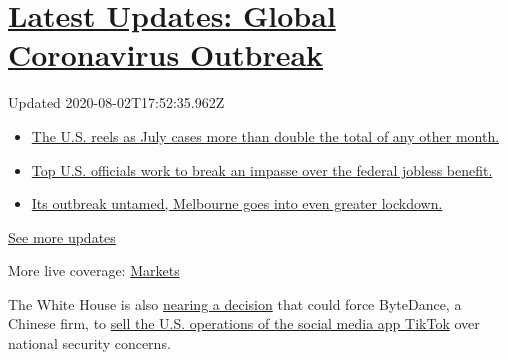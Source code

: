 \hypertarget{latest-updates-global-coronavirus-outbreak}{%
\section{\texorpdfstring{\href{https://www.nytimes.com/2020/08/01/world/coronavirus-covid-19.html?action=click\&pgtype=Article\&state=default\&region=MAIN_CONTENT_1\&context=storylines_live_updates}{Latest
Updates: Global Coronavirus
Outbreak}}{Latest Updates: Global Coronavirus Outbreak}}\label{latest-updates-global-coronavirus-outbreak}}

Updated 2020-08-02T17:52:35.962Z

\begin{itemize}
\tightlist
\item
  \href{https://www.nytimes.com/2020/08/01/world/coronavirus-covid-19.html?action=click\&pgtype=Article\&state=default\&region=MAIN_CONTENT_1\&context=storylines_live_updates\#link-34047410}{The
  U.S. reels as July cases more than double the total of any other
  month.}
\item
  \href{https://www.nytimes.com/2020/08/01/world/coronavirus-covid-19.html?action=click\&pgtype=Article\&state=default\&region=MAIN_CONTENT_1\&context=storylines_live_updates\#link-780ec966}{Top
  U.S. officials work to break an impasse over the federal jobless
  benefit.}
\item
  \href{https://www.nytimes.com/2020/08/01/world/coronavirus-covid-19.html?action=click\&pgtype=Article\&state=default\&region=MAIN_CONTENT_1\&context=storylines_live_updates\#link-2bc8948}{Its
  outbreak untamed, Melbourne goes into even greater lockdown.}
\end{itemize}

\href{https://www.nytimes.com/2020/08/01/world/coronavirus-covid-19.html?action=click\&pgtype=Article\&state=default\&region=MAIN_CONTENT_1\&context=storylines_live_updates}{See
more updates}

More live coverage:
\href{https://www.nytimes.com/live/2020/07/31/business/stock-market-today-coronavirus?action=click\&pgtype=Article\&state=default\&region=MAIN_CONTENT_1\&context=storylines_live_updates}{Markets}

The White House is also
\href{https://www.nytimes.com/2020/07/31/technology/tiktok-microsoft.html}{nearing
a decision} that could force ByteDance, a Chinese firm, to
\href{https://www.nytimes.com/2020/08/01/technology/tiktok-sale-trump-ban.html}{sell
the U.S. operations of the social media app TikTok} over national
security concerns.

